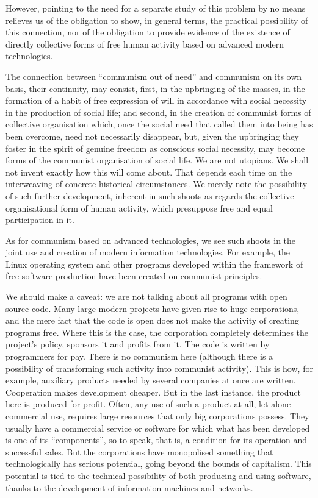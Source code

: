 \documentclass[12pt,a4paper,openany]{book}
\begin{document}
However, pointing to the need for a separate study of this problem by no means relieves us of the obligation to show, in general terms, the practical possibility of this connection, nor of the obligation to provide evidence of the existence of directly collective forms of free human activity based on advanced modern technologies.

The connection between “communism out of need” and communism on its own basis, their continuity, may consist, first, in the upbringing of the masses, in the formation of a habit of free expression of will in accordance with social necessity in the production of social life; and second, in the creation of communist forms of collective organisation which, once the social need that called them into being has been overcome, need not necessarily disappear, but, given the upbringing they foster in the spirit of genuine freedom as conscious social necessity, may become forms of the communist organisation of social life. We are not utopians. We shall not invent exactly how this will come about. That depends each time on the interweaving of concrete-historical circumstances. We merely note the possibility of such further development, inherent in such shoots as regards the collective-organisational form of human activity, which presuppose free and equal participation in it.

As for communism based on advanced technologies, we see such shoots in the joint use and creation of modern information technologies. For example, the Linux operating system and other programs developed within the framework of free software production have been created on communist principles.

We should make a caveat: we are not talking about all programs with open source code. Many large modern projects have given rise to huge corporations, and the mere fact that the code is open does not make the activity of creating programs free. Where this is the case, the corporation completely determines the project’s policy, sponsors it and profits from it. The code is written by programmers for pay. There is no communism here (although there is a possibility of transforming such activity into communist activity). This is how, for example, auxiliary products needed by several companies at once are written. Cooperation makes development cheaper. But in the last instance, the product here is produced for profit. Often, any use of such a product at all, let alone commercial use, requires large resources that only big corporations possess. They usually have a commercial service or software for which what has been developed is one of its “components”, so to speak, that is, a condition for its operation and successful sales. But the corporations have monopolised something that technologically has serious potential, going beyond the bounds of capitalism. This potential is tied to the technical possibility of both producing and using software, thanks to the development of information machines and networks.
\end{document}

